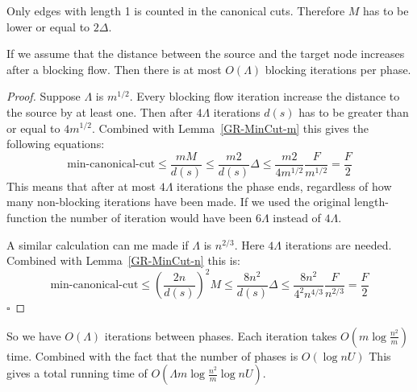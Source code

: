 Only edges with length 1 is counted in the canonical cuts. Therefore $M$ has to be lower or equal to $2\Delta$.

\begin{lemma}
	If we assume that the distance between the source and the target node increases after a blocking flow. Then there is at most $O(\Lambda)$ blocking
	iterations per phase.
\end{lemma}
\begin{proof}
	Suppose $\Lambda$ is $m^{1/2}$. Every blocking flow iteration increase the distance to the source by at least one.
	Then after $4\Lambda$ iterations $d(s)$ has to be greater than or equal to $4m^{1/2}$. Combined with Lemma~\ref{GR-MinCut-m} this gives the following equations:
	$$\text{min-canonical-cut} \leq \frac{mM}{d(s)} \leq \frac{m2}{d(s)} \Delta \leq \frac{m2}{4m^{1/2}}\frac{F}{m^{1/2}} = \frac{F}{2}$$
	This means that after at most $4\Lambda$ iterations the phase ends, regardless of how many non-blocking iterations have been made.
	If we used the original length-function the number of iteration would have been $6\Lambda$ instead of $4\Lambda$. 
	
	A similar calculation can me made if $\Lambda$ is $n^{2/3}$. Here $4\Lambda$ iterations are needed. Combined with Lemma~\ref{GR-MinCut-n} this is:
	$$\text{min-canonical-cut} \leq \left(\frac{2n}{d(s)}\right)^2 M \leq \frac{8n^2}{d(s)} \Delta \leq \frac{8n^2}{4^2n^{4/3}} \frac{F}{n^{2/3}} = \frac{F}{2}$$
	$\square$
\end{proof}
So we have $O(\Lambda)$ iterations between phases. Each iteration takes $O(m\log{\frac{n^2}{m}})$ time. Combined with the fact that the number of
phases is $O(\log{nU})$ This gives a total running time of $O(\Lambda m\log{\frac{n^2}{m}} \log{nU})$. 


